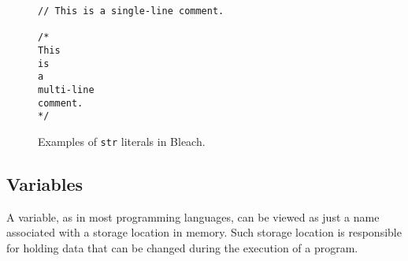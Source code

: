     \begin{figure}[H]
        \centering
        \begin{lstlisting}
// This is a single-line comment.

/*
This 
is
a
multi-line
comment.
*/
        \end{lstlisting}
        \caption{Examples of \texttt{str} literals in Bleach.}
    \end{figure}

\subsection{Variables}
A variable, as in most programming languages, can be viewed as just a name associated with a storage location in memory. Such storage location is responsible for holding data that can be changed during the execution of a program.

